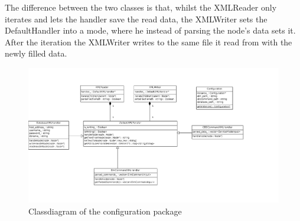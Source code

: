 The difference between the two classes is that, whilst the XMLReader only iterates and lets the handler save the read data, the XMLWriter sets 
the DefaultHandler into a mode, where he instead of parsing the node’s data sets it. After the iteration the XMLWriter writes to the same file 
it read from with the newly filled data.
\begin{figure}[h!]
 \includegraphics{figures/classdiagram_configuration}
 \caption{Classdiagram of the configuration package}
\end{figure}

